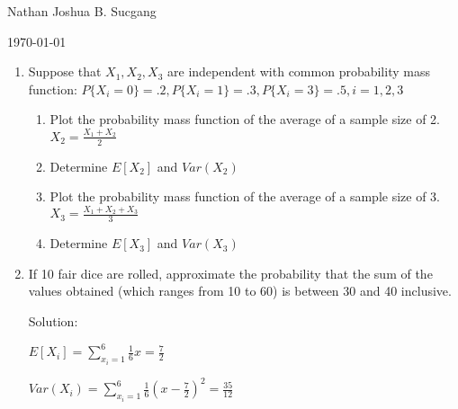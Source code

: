 \documentclass{article}
\begin{document}
Nathan Joshua B. Sucgang

\today

\begin{enumerate}
    \item Suppose that $X_1, X_2, X_3$ are independent with common probability mass function: $P\{X_i = 0 \} = .2, P\{X_i = 1 \} = .3, P\{X_i = 3 \} = .5, i = 1,2,3$
    \begin{enumerate}
        \item Plot the probability mass function of the average of a sample size of 2. $X_2 = \frac{X_1+X_2}{2}$
        \item Determine $E[X_2]$ and $Var(X_2)$
        \item Plot the probability mass function of the average of a sample size of 3. $X_3 = \frac{X_1+X_2+X_3}{3}$
        \item Determine $E[X_3]$ and $Var(X_3)$
    \end{enumerate}  
    \item If 10 fair dice are rolled, approximate the probability that the sum of the values obtained (which ranges from 10 to 60) is between 30 and 40 inclusive.
    
    Solution:

    $E[X_i] = \displaystyle \sum_{x_i = 1}^6 {\frac{1}{6}x = \frac{7}{2}}$

    $Var(X_i) = \displaystyle \sum_{x_i = 1}^6 {\frac{1}{6}{(x - \frac{7}{2})}^2 = \frac{35}{12}}$


\end{enumerate}
\end{document}
